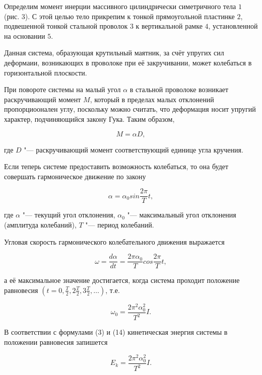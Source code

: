 Определим момент инерции массивного цилиндрически симетричного тела $1$ (рис. 3).
С этой целью тело прикрепим к тонкой прямоугольной пластинке $2$,
подвешенной тонкой стальной проволок $3$ к вертикальной рамке $4$,
установленной на основании $5$.

Данная система, образующая крутильный маятник, за счёт упругих сил деформаии,
возникающих в проволоке при её закручивании, может колебаться в горизонтальной плоскости.

При повороте системы на малый угол $\alpha$ в стальной проволоке возникает раскручивающий момент $M$,
который в пределах малых отклонений пропорциоонален углу, поскольку можно считать,
что деформация носит упругий характер, подчиняющийся закону Гука. Таким образом, 

\begin{equation}
    M = \alpha D,
\end{equation}

где $D$ "--- раскручивающий момент соответствующий единице угла кручения.

Если теперь системе предоставить возможность колебаться,
то она будет совершать гармоническое движение по закону

\begin{equation}
    \alpha = \alpha_0 sin\frac{2\pi}{T}t,
\end{equation}

где $\alpha$ "--- текущий угол отклонения, $\alpha_0$ "--- максимальный угол отклонения (амплитуда колебаний),
$T$ "--- период колебаний.

Угловая скорость гармонического колебательного движения выражается

\begin{equation}
    \omega = \frac{d\alpha}{dt} = \frac{2\pi\alpha_0}{T}cos\frac{2\pi}{T}t,
\end{equation}

а её максимальное значение достигается, когда система проходит положение равновесия $(t = 0, \frac{T}{2}, 2\frac{T}{2}, 3\frac{T}{2}, \dots)$, т.е.

\begin{equation}
    \omega_0 = \frac{2\pi^2\alpha_0^2}{T^2}I.
\end{equation}

В соответствии с формулами (3) и (14) кинетическая энергия системы в положении равновесия запишется

\begin{equation}
    E_k = \frac{2\pi^2\alpha_0^2}{T^2}I.
\end{equation}

